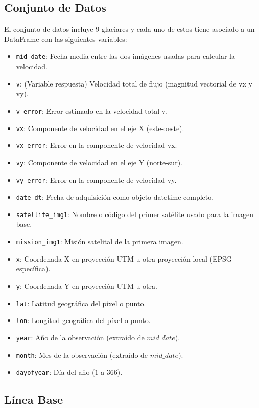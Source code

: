 \documentclass[sigconf,authordraft,language=spanish]{acmart}
\begin{document}
\subsection{Conjunto de Datos}

El conjunto de datos incluye $9$ glaciares y cada uno de estos tiene asociado a un DataFrame con las siguientes variables:

\begin{itemize}
    \item \verb|mid_date|: Fecha media entre las dos imágenes usadas para calcular la velocidad.
    \item \verb|v|: (Variable respuesta) Velocidad total de flujo (magnitud vectorial de vx y vy).
    \item \verb|v_error|:	Error estimado en la velocidad total v.
    \item \verb|vx|:	Componente de velocidad en el eje X (este-oeste).
    \item \verb|vx_error|:	Error en la componente de velocidad vx.
    \item \verb|vy|:	Componente de velocidad en el eje Y (norte-sur).
    \item \verb|vy_error|:	Error en la componente de velocidad vy.
    \item \verb|date_dt|:	Fecha de adquisición como objeto datetime completo.
    \item \verb|satellite_img1|:	Nombre o código del primer satélite usado para la imagen base.
    \item \verb|mission_img1|:	Misión satelital de la primera imagen.
    \item \verb|x|:	Coordenada X en proyección UTM u otra proyección local (EPSG específica).
    \item \verb|y|:	Coordenada Y en proyección UTM u otra.
    \item \verb|lat|:	Latitud geográfica del píxel o punto.
    \item \verb|lon|:	Longitud geográfica del píxel o punto.
    \item \verb|year|:	Año de la observación (extraído de $mid\_date$).
    \item \verb|month|:	Mes de la observación (extraído de $mid\_date$).
    \item \verb|dayofyear|:	Día del año ($1$ a $366$).

\end{itemize}

\subsection{Línea Base}
\end{document}
